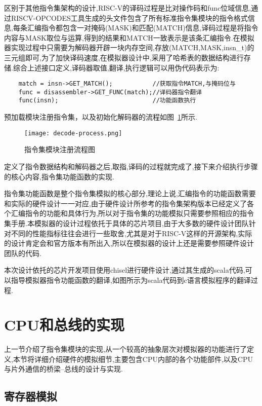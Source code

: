 区别于其他指令集架构的设计,RISC-V的译码过程是比对操作码和func位域信息,通过RISCV-OPCODES工具生成的头文件包含了所有标准指令集模块的指令格式信息,每条汇编指令都包含一对掩码(MASK)和匹配(MATCH)信息,译码过程是将指令内容与MASK取位与运算,得到的结果和MATCH一致表示是该条汇编指令.在模拟器实现过程中只需要为解码器开辟一块内存空间,存放(MATCH,MASK,insn\_t)的三元组即可,为了加快译码速度,在模拟器设计中,采用了哈希表的数据结构进行存储.综合上述接口定义,译码器取值,翻译,执行逻辑可以用伪代码表示为:
\begin{lstlisting}
    match = insn->GET_MATCH();           //获取指令MATCH,与掩码位与
    func = disassembler->GET_FUNC(match);//译码器指令翻译
    func(insn);                          //功能函数执行
\end{lstlisting}
预加载模块注册指令集，以及初始化解码器的流程如图~\ref{fig:decode-process}所示.
\begin{figure}[H]
  \centering
  \texttt{[image: decode-process.png]}
  \caption{指令集模块注册流程图}
  \label{fig:decode-process}
\end{figure}


定义了指令数据结构和解码器之后,取指,译码的过程就完成了,接下来介绍执行步骤的核心内容,指令集功能函数的实现.


指令集功能函数是整个指令集模拟的核心部分,理论上说,汇编指令的功能函数需要和实际的硬件设计一一对应,由于硬件设计所参考的指令集架构版本已经定义了各个汇编指令的功能和具体行为,所以对于指令集的功能模拟只需要参照相应的指令集手册.本模拟器的设计过程依托于具体的芯片项目,由于大多数的硬件设计团队针对不同的性能指标往往会进行一些取舍,尤其是对于RISC-V这样的开源架构,实际的设计肯定会和官方版本有所出入,所以在模拟器的设计上还是需要参照硬件设计团队的代码.


本次设计依托的芯片开发项目使用chisel进行硬件设计,通过其生成的scala代码,可以指导模拟器指令功能函数的翻译,如图所示为scala代码到c语言模拟程序的翻译过程.


\section{CPU和总线的实现}

上一节介绍了指令集模块的实现,从一个较高的抽象层次对模拟器的功能进行了定义,本节将详细介绍硬件的模拟细节,主要包含CPU内部的各个功能部件,以及CPU与片外通信的桥梁--总线的设计与实现.


\subsection{寄存器模拟}

